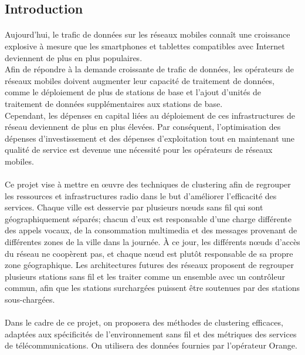 \documentclass{article}
\begin{document}
  \begin{center}
\section*{\LARGE{Introduction}}
  \end{center}
\Large{\paragraph{}
        Aujourd'hui, le trafic de données sur les réseaux mobiles connaît une croissance explosive à mesure que les smartphones et tablettes compatibles avec Internet deviennent de plus en plus populaires.\\
Afin de répondre à la demande croissante de trafic de données, les opérateurs de réseaux mobiles doivent augmenter leur capacité de traitement de données, comme le déploiement de plus de stations de base et l'ajout d'unités de traitement de données supplémentaires aux stations de base. \\
Cependant, les dépenses en capital liées au déploiement de ces infrastructures de réseau deviennent de plus en plus élevées. Par conséquent, l'optimisation des dépenses d'investissement et des dépenses d'exploitation tout en maintenant une qualité de service est devenue une nécessité pour les opérateurs de réseaux mobiles.
\paragraph{}
Ce projet vise à mettre en œuvre des techniques de clustering afin de regrouper les ressources et infrastructures radio dans le but d'améliorer l'efficacité des services. 
Chaque ville est desservie par plusieurs nœuds sans fil qui sont géographiquement séparés; chacun d'eux est responsable d'une charge différente des appels vocaux, de la consommation multimedia et des messages provenant de différentes zones de la ville dans la journée. 
À ce jour, les différents nœuds d'accès du réseau ne coopèrent pas, et chaque nœud est plutôt responsable de sa propre zone géographique. Les architectures futures des réseaux proposent de regrouper plusieurs stations sans fil et les traiter comme un ensemble avec un contrôleur commun, afin que les stations surchargées puissent être soutenues par des stations sous-chargées. 
\paragraph{}
Dans le cadre de ce projet, on proposera des méthodes de clustering efficaces, adaptées aux spécificités de l'environnement sans fil et des métriques des services de télécommunications. On utilisera des données fournies par l’opérateur Orange.
}
\newpage
\end{document}
